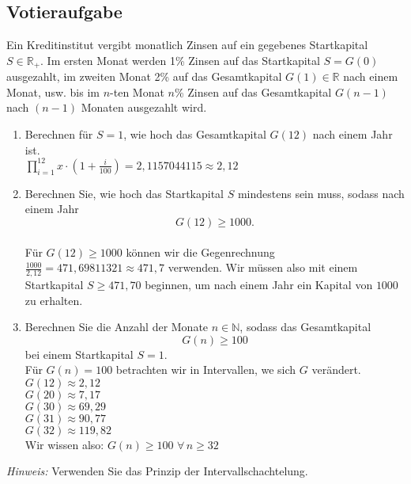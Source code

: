 \documentclass[a4paper]{article}
\begin{document}
\subsection{Votieraufgabe}
Ein Kreditinstitut vergibt monatlich Zinsen auf ein gegebenes Startkapital $S \in\mathbb{R}_+$. Im ersten Monat werden 1\% Zinsen auf das Startkapital $S= G(0)$ ausgezahlt, im zweiten Monat 2\% auf das Gesamtkapital $G(1) \in \mathbb{R}$ nach einem Monat, usw. bis im $n$-ten Monat $n$\% Zinsen auf das Gesamtkapital $G(n-1)$ nach $(n-1)$ Monaten ausgezahlt wird.
\begin{enumerate}[label=({\alph*})]
    \item Berechnen für $S = 1$, wie hoch das Gesamtkapital $G(12)$ nach einem Jahr ist.\\
    \(\prod\limits^{12}_{i=1} x \cdot (1+\frac{i}{100})=2,1157044115\approx 2,12\)
    \item Berechnen Sie, wie hoch das Startkapital $S$ mindestens sein muss, sodass nach einem Jahr \[G(12) \geq 1000.\]\\
    Für $G(12)\geq 1000 $ können wir die Gegenrechnung $\frac{1000}{2,12}=471,69811321 \approx 471,7 $ verwenden. Wir müssen also mit einem Startkapital $S\geq 471,70 $ beginnen, um nach einem Jahr ein Kapital von $1000 $ zu erhalten.
    \item Berechnen Sie die Anzahl der Monate $n\in\mathbb{N}$, sodass das Gesamtkapital
    \[G(n) \geq 100\]
    bei einem Startkapital $S = 1$.\\
    Für $G(n)=100$ betrachten wir in Intervallen, we sich $G$ verändert.\\
    $G(12)\approx 2,12$\\
    $G(20)\approx 7,17$\\
    $G(30)\approx 69,29$\\
    $G(31)\approx 90,77$\\
    $G(32)\approx 119,82$\\
    Wir wissen also: $G(n)\geq 100 \,\, \forall\, n\geq 32$
\end{enumerate}
\textit{Hinweis:} Verwenden Sie das Prinzip der Intervallschachtelung.
\end{document}
